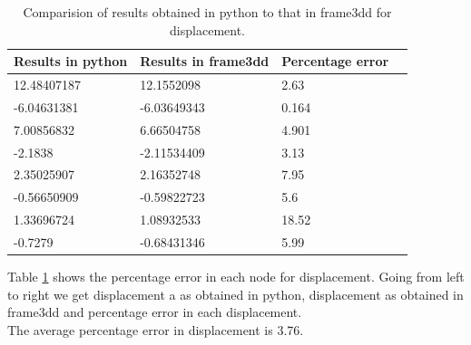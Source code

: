 \begin{table}[h!]
	\centering
	\begin{tabular}{|l|l|l|l|}
		\hline
	      Results in python & Results in frame3dd & Percentage error   \\
		\hline
	
	      12.48407187  &12.1552098     &2.63          \\
	     -6.04631381   &-6.03649343    &0.164          \\
	      7.00856832   & 6.66504758    &4.901         \\
	     -2.1838       &-2.11534409    &3.13         \\
	      2.35025907   & 2.16352748    &7.95         \\
	     -0.56650909   &-0.59822723    &5.6         \\
          1.33696724   & 1.08932533    &18.52        \\
         -0.7279       &-0.68431346    &5.99          \\
        
		\hline  
	\end{tabular}
		\caption{Comparision of results obtained in python to that in frame3dd for displacement.}
\label{Comparision_table}
\end{table}

Table \ref{Comparision_table} shows the percentage error in each node for displacement. Going from left to right we get  displacement a as obtained in python, displacement as obtained in frame3dd and percentage error in each displacement.\\

The average percentage error in displacement is 3.76.\\



